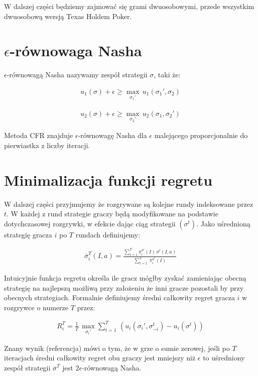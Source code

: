 \documentclass[licencjacka]{pracamgr}
\begin{document}
\noindent
W dalszej części będziemy zajmować się grami dwuosobowymi, przede wszystkim dwuosobową wersją Texas Holdem Poker.

\section{$\epsilon$-równowaga Nasha}

$\epsilon$-równowagą Nasha nazywamy zespół strategii $\sigma$, taki że:

\begin{align*}
u_1(\sigma) + \epsilon \geq  \max_{\sigma_1'} \, u_1(\sigma_1', \sigma_2) 
\end{align*}

\begin{align*}
u_2(\sigma) + \epsilon \geq  \max_{\sigma_2'} \, u_2(\sigma_1, \sigma_2') 
\end{align*}

\noindent
Metoda CFR znajduje $\epsilon$-równowagę Nasha dla $\epsilon$ malejącego proporcjonalnie do pierwiastka z liczby iteracji.

\section{Minimalizacja funkcji regretu}

W dalszej części przyjmujemy że rozgrywane są kolejne rundy indeksowane przez $t$. W każdej z rund
strategie graczy będą modyfikowane na podstawie dotychczasowej rozgrywki, w efekcie dając ciąg strategii
$(\sigma^t)$. Jako uśrednioną strategię gracza $i$ po $T$ rundach definiujemy:

\begin{align*}
\overline{\sigma}_i^T(I, a) = \frac{\sum\limits_{t=1}^T \pi_i^{\sigma^t}(I) \, \sigma^t(I, a)}{\sum\limits_{t=1}^T \, \pi_i^{\sigma^t}(I)}
\end{align*}

\noindent
Intuicyjnie funkcja regretu określa ile gracz mógłby zyskać zamieniając obecną strategię na najlepszą możliwą
przy założeniu że inni gracze pozostali by przy obecnych strategiach. Formalnie definiujemy średni całkowity regret gracza $i$
w rozgrywce o numerze $T$ przez:

\begin{align*}
R_i^T = \frac{1}{T} \, \max_{\sigma_i'} \sum\limits_{t=1}^T \, (u_i(\sigma_i', \sigma_{-i}^t) - u_i(\sigma^t))
\end{align*}

\noindent
Znany wynik (referencja) mówi o tym, że w grze o sumie zerowej, jeśli po $T$ iteracjach średni całkowity regret obu graczy
jest mniejszy niż $\epsilon$ to uśredniony zespół strategii $\overline{\sigma}^T$ jest $2\epsilon$-równowagą Nasha.
\end{document}
